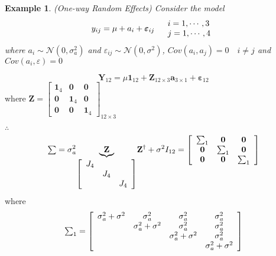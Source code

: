 \documentclass{article}
\newtheorem{example}[theorem]{Example}
\begin{document}
\bigskip

\begin{example}
(One-way Random Effects) Consider the model%
\begin{equation*}
y_{ij}=\mu +a_{i}+\mathbf{\varepsilon }_{ij}\quad 
\begin{tabular}{l}
$i=1,\cdots ,3$ \\ 
$j=1,\cdots ,4$%
\end{tabular}%
\end{equation*}%
where $a_{i}\sim \mathcal{N}\left( 0,\sigma _{a}^{2}\right) $ and $%
\varepsilon _{ij}\sim \mathcal{N}\left( 0,\sigma ^{2}\right) $, $Cov\left(
a_{i},a_{j}\right) =0\quad i\neq j$ and $Cov\left( a_{i},\varepsilon \right)
=0$
\end{example}

\bigskip

\begin{equation*}
\mathbf{Y}_{12}=\mu \mathbf{1}_{12}+\mathbf{Z}_{12\times 3}\mathbf{a}%
_{3\times 1}+\mathbf{\varepsilon }_{12}
\end{equation*}%
where $\mathbf{Z}=\left[ 
\begin{array}{ccc}
\boldsymbol{1}_{4} & \boldsymbol{0} & \boldsymbol{0} \\ 
\boldsymbol{0} & \boldsymbol{1}_{4} & \boldsymbol{0} \\ 
\boldsymbol{0} & \boldsymbol{0} & \boldsymbol{1}_{4}%
\end{array}%
\right] _{12\times 3}$

\bigskip

$\therefore $%
\begin{equation*}
\tsum =\sigma _{a}^{2}\underset{\left[ 
\begin{array}{ccc}
J_{4} &  &  \\ 
& J_{4} &  \\ 
&  & J_{4}%
\end{array}%
\right] }{\underbrace{\mathbf{Z}}}\mathbf{Z}^{\dagger }+\sigma ^{2}I_{12}=%
\left[ 
\begin{array}{ccc}
\tsum_{1} & \boldsymbol{0} & \boldsymbol{0} \\ 
\boldsymbol{0} & \tsum_{1} & \boldsymbol{0} \\ 
\boldsymbol{0} & \boldsymbol{0} & \tsum_{1}%
\end{array}%
\right]
\end{equation*}%
where%
\begin{equation*}
\tsum\nolimits_{1}=\left[ 
\begin{array}{cccc}
\sigma _{a}^{2}+\sigma ^{2} & \sigma _{a}^{2} & \sigma _{a}^{2} & \sigma
_{a}^{2} \\ 
& \sigma _{a}^{2}+\sigma ^{2} & \sigma _{a}^{2} & \sigma _{a}^{2} \\ 
&  & \sigma _{a}^{2}+\sigma ^{2} & \sigma _{a}^{2} \\ 
&  &  & \sigma _{a}^{2}+\sigma ^{2}%
\end{array}%
\right]
\end{equation*}
\end{document}
